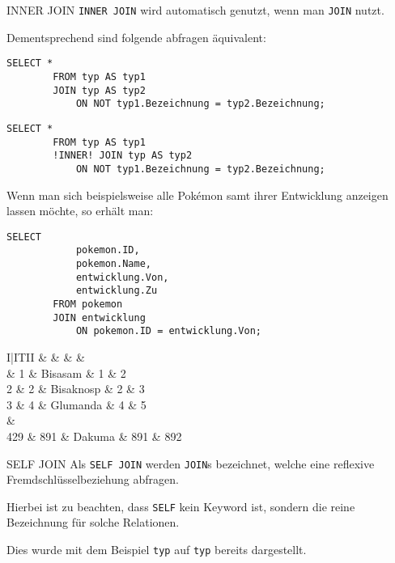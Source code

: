 \begin{sql}{INNER JOIN}
    \texttt{INNER JOIN} wird automatisch genutzt, wenn man \texttt{JOIN} nutzt.

    Dementsprechend sind folgende abfragen äquivalent:

    \begin{lstlisting}[style=SqlInputStyle]
        SELECT *
        FROM typ AS typ1
        JOIN typ AS typ2
            ON NOT typ1.Bezeichnung = typ2.Bezeichnung;
    \end{lstlisting}

    \begin{lstlisting}[style=SqlInputStyle]
        SELECT *
        FROM typ AS typ1
        !INNER! JOIN typ AS typ2
            ON NOT typ1.Bezeichnung = typ2.Bezeichnung;
    \end{lstlisting}

    Wenn man sich beispielsweise alle Pokémon samt ihrer Entwicklung anzeigen lassen möchte, so erhält man:

    \begin{lstlisting}[style=SqlInputStyle]
        SELECT
            pokemon.ID,
            pokemon.Name,
            entwicklung.Von,
            entwicklung.Zu
        FROM pokemon
        JOIN entwicklung
            ON pokemon.ID = entwicklung.Von;
    \end{lstlisting}

    \begin{tabular}{I|ITII}
        &  &  &  &  \\ & 1 & Bisasam & 1 & 2 \\
        2 & 2 & Bisaknosp & 2 & 3 \\
        3 & 4 & Glumanda & 4 & 5 \\
         &  \\
        429 & 891 & Dakuma & 891 & 892 \\
    \end{tabular}
\end{sql}

\begin{defi}{SELF JOIN}
    Als \texttt{SELF JOIN} werden \texttt{JOIN}s bezeichnet, welche eine reflexive Fremdschlüsselbeziehung abfragen.
    
    Hierbei ist zu beachten, dass \texttt{SELF} kein Keyword ist, sondern die reine Bezeichnung für solche Relationen.

    Dies wurde mit dem Beispiel \texttt{typ} auf \texttt{typ} bereits dargestellt.
\end{defi}

